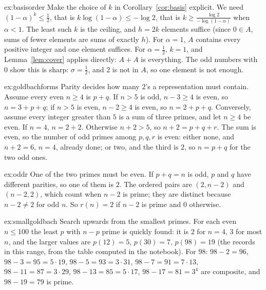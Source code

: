 \begin{solution}{ex:basisorder}
\idea Make the choice of $k$ in Corollary~\ref{cor:basis} explicit.
\writeup We need $(1-\alpha)^k\le\frac12$, that is $k\log(1-\alpha)\le-\log2$, that is $k\ge\frac{\log2}{-\log(1-\alpha)}$ when $\alpha<1$. The least such $k$ is
the ceiling, and $h=2k$ elements suffice (since $0\in A$, sums of fewer elements are sums of exactly $h$). For $\alpha=1$, $A$ contains every positive integer
and one element suffices. For $\alpha=\frac12$, $k=1$, and Lemma~\ref{lem:cover} applies directly: $A+A$ is everything. The odd numbers with $0$ show this
is sharp: $\sigma=\frac12$, and $2$ is not in $A$, so one element is not enough.
\end{solution}

\begin{solution}{ex:goldbachforms}
\idea Parity decides how many $2$'s a representation must contain.
\writeup Assume every even $n\ge4$ is $p+q$. If $n>5$ is odd, $n-3\ge4$ is even, so $n=3+p+q$; if $n>5$ is even, $n-2\ge4$ is even, so $n=2+p+q$. Conversely,
assume every integer greater than $5$ is a sum of three primes, and let $n\ge4$ be even. If $n=4$, $n=2+2$. Otherwise $n+2>5$, so $n+2=p+q+r$. The sum is
even, so the number of odd primes among $p,q,r$ is even: either none, and $n+2=6$, $n=4$, already done; or two, and the third is $2$, so $n=p+q$ for the two
odd ones.
\end{solution}

\begin{solution}{ex:oddr}
\idea One of the two primes must be even.
\writeup If $p+q=n$ is odd, $p$ and $q$ have different parities, so one of them is $2$. The ordered pairs are $(2,n-2)$ and $(n-2,2)$, which count when $n-2$
is prime; they are distinct because $n-2\ne2$ for odd $n$. So $r(n)=2$ if $n-2$ is prime and $0$ otherwise.
\end{solution}

\begin{solution}{ex:smallgoldbach}
\idea Search upwards from the smallest primes.
\writeup For each even $n\le100$ the least $p$ with $n-p$ prime is quickly found: it is $2$ for $n=4$, $3$ for most $n$, and the larger values are
$p(12)=5$, $p(30)=7$, $p(98)=19$ (the records in this range, from the table computed in the notebook). For $98$: $98-2=96$, $98-3=95=5\cdot19$,
$98-5=93=3\cdot31$, $98-7=91=7\cdot13$, $98-11=87=3\cdot29$, $98-13=85=5\cdot17$, $98-17=81=3^4$ are composite, and $98-19=79$ is prime.
\end{solution}

